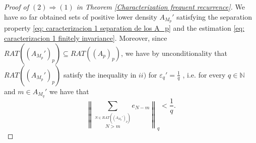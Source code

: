 \documentclass[11pt]{amsart}
\newcommand{\zN}{\mathbb N}
\newcommand{\sub}{\subseteq}
\begin{document}
\begin{proof}[Proof of  $(2)\Rightarrow (1)$ in Theorem \ref{Characterization frequent recurrence}]


We have so far obtained sets of positive lower density $A_{M_p}'$  satisfying the separation property \eqref{eq: caracterizacion 1 separation de los A_p} and the estimation \eqref{eq: caracterizacion 1 finitely invariance}. Moreover, since $RAT((A_{M_p}')_p)\subseteq RAT((A_{p})_p)$, we have by unconditionality  that $RAT((A_{M_p}')_p)$ satisfy the inequality in $ii)$ for  $\varepsilon_q'=\frac1{q}$
, i.e. for every $q\in \zN$ and $m\in A_{M_{q}}'$ we have that
\begin{equation}\label{eq: norma de la suma RAT(A') <1/q}
\left\|\sum_{\overset{N\in RAT((A_{M_p}')_p)}{N>m}} e_{N-m}\right\|_q<\frac{1}{q}.    
\end{equation}




\end{proof}
\end{document}

